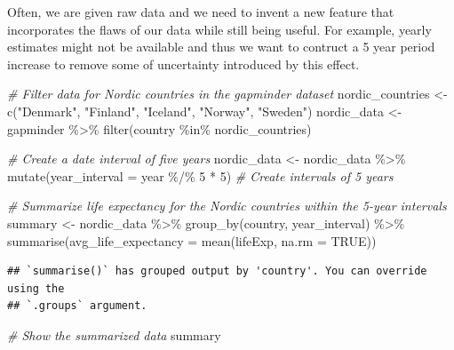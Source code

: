 \documentclass[
]{book}
\newenvironment{Shaded}{\begin{snugshade}}{\end{snugshade}}
\newcommand{\AttributeTok}[1]{\textcolor[rgb]{0.77,0.63,0.00}{#1}}
\newcommand{\CommentTok}[1]{\textcolor[rgb]{0.56,0.35,0.01}{\textit{#1}}}
\newcommand{\ConstantTok}[1]{\textcolor[rgb]{0.00,0.00,0.00}{#1}}
\newcommand{\DecValTok}[1]{\textcolor[rgb]{0.00,0.00,0.81}{#1}}
\newcommand{\FunctionTok}[1]{\textcolor[rgb]{0.00,0.00,0.00}{#1}}
\newcommand{\NormalTok}[1]{#1}
\newcommand{\OtherTok}[1]{\textcolor[rgb]{0.56,0.35,0.01}{#1}}
\newcommand{\SpecialCharTok}[1]{\textcolor[rgb]{0.00,0.00,0.00}{#1}}
\newcommand{\StringTok}[1]{\textcolor[rgb]{0.31,0.60,0.02}{#1}}
\begin{document}
Often, we are given raw data and we need to invent a new feature that
incorporates the flaws of our data while still being useful. For
example, yearly estimates might not be available and thus we want to
contruct a 5 year period increase to remove some of uncertainty
introduced by this effect.

\begin{Shaded}
\begin{Highlighting}[]
\CommentTok{\# Filter data for Nordic countries in the \textquotesingle{}gapminder\textquotesingle{} dataset}
\NormalTok{nordic\_countries }\OtherTok{\textless{}{-}} \FunctionTok{c}\NormalTok{(}\StringTok{"Denmark"}\NormalTok{, }\StringTok{"Finland"}\NormalTok{, }\StringTok{"Iceland"}\NormalTok{, }\StringTok{"Norway"}\NormalTok{, }\StringTok{"Sweden"}\NormalTok{)}
\NormalTok{nordic\_data }\OtherTok{\textless{}{-}}\NormalTok{ gapminder }\SpecialCharTok{\%\textgreater{}\%} \FunctionTok{filter}\NormalTok{(country }\SpecialCharTok{\%in\%}\NormalTok{ nordic\_countries)}

\CommentTok{\# Create a date interval of five years}
\NormalTok{nordic\_data }\OtherTok{\textless{}{-}}\NormalTok{ nordic\_data }\SpecialCharTok{\%\textgreater{}\%}
  \FunctionTok{mutate}\NormalTok{(}\AttributeTok{year\_interval =}\NormalTok{ year }\SpecialCharTok{\%/\%} \DecValTok{5} \SpecialCharTok{*} \DecValTok{5}\NormalTok{)  }\CommentTok{\# Create intervals of 5 years}

\CommentTok{\# Summarize life expectancy for the Nordic countries within the 5{-}year intervals}
\NormalTok{summary }\OtherTok{\textless{}{-}}\NormalTok{ nordic\_data }\SpecialCharTok{\%\textgreater{}\%}
  \FunctionTok{group\_by}\NormalTok{(country, year\_interval) }\SpecialCharTok{\%\textgreater{}\%}
  \FunctionTok{summarise}\NormalTok{(}\AttributeTok{avg\_life\_expectancy =} \FunctionTok{mean}\NormalTok{(lifeExp, }\AttributeTok{na.rm =} \ConstantTok{TRUE}\NormalTok{))}
\end{Highlighting}
\end{Shaded}

\begin{verbatim}
## `summarise()` has grouped output by 'country'. You can override using the
## `.groups` argument.
\end{verbatim}

\begin{Shaded}
\begin{Highlighting}[]
\CommentTok{\# Show the summarized data}
\NormalTok{summary}
\end{Highlighting}
\end{Shaded}
\end{document}
